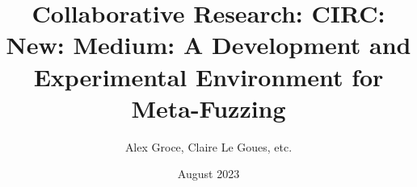 \documentclass[numbers]{proposalnsf}
\title{Collaborative Research: CIRC: New: Medium: A Development and 
Experimental Environment for Meta-Fuzzing}
\author{Alex Groce, Claire Le Goues, etc.}
\date{August 2023}
\newcommand{\cut}[1]{}
\begin{document}
\cut{
Cover Sheet
Project Summary
Table of Contents (automatically generated)
Project Description
References Cited
Biographical Sketch(es)
Budget and Budget Justification
Current and Pending Support
Facilities, Equipment and Other Resources
Data Management Plan
Postdoctoral Mentoring Plan (if applicable)
Collaborators & Other Affiliations Information
}

\newpage

\newpage
\tableofcontents
\newpage
{}
\setcounter{page}{1} 









\end{document}
